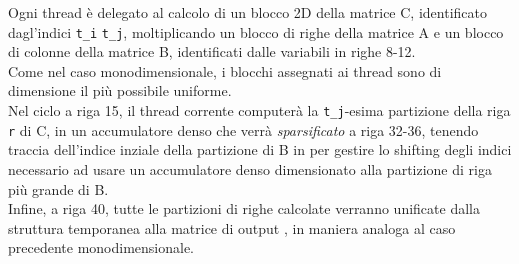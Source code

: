 Ogni thread è delegato al calcolo di un blocco 2D della matrice C,
identificato dagl'indici \verb|t_i| \verb|t_j|, 
moltiplicando un blocco di righe della matrice A e un blocco di colonne della matrice B,
identificati dalle variabili in righe 8-12.\\
Come nel caso monodimensionale, i blocchi assegnati ai thread sono di dimensione il più possibile uniforme.\\
Nel ciclo a riga 15, il thread corrente computerà la \verb|t_j|-esima partizione della riga \verb|r| di C, 
in un accumulatore denso che verrà \emph{sparsificato} a riga 32-36,
tenendo traccia dell'indice inziale della partizione di B in  per gestire lo 
shifting degli indici necessario ad usare un accumulatore denso dimensionato alla 
partizione di riga più grande di B.\\
Infine, a riga 40, tutte le partizioni di righe calcolate verranno unificate dalla struttura 
temporanea  alla matrice di output ,
in maniera analoga al caso precedente monodimensionale.\\


